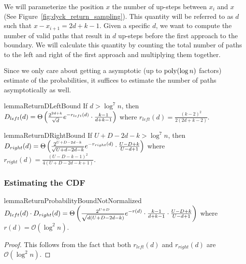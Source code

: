 We will parameterize the position $x$ the number of up-steps between $x_i$ and $x$
(See Figure~\ref{fig:dyck_return_sampling}).
This quantity will be referred to as $d$ such that $x - x_{i+1} = 2d + k-1$.
Given a specific $d$, we want to compute the number of valid paths that result in
$d$ up-steps before the first approach to the boundary.
We will calculate this quantity by counting the total number of paths to the left and right
of the first approach and multiplying them together.

Since we only care about getting a asymptotic (up to $\mathrm{poly}(\log n)$ factors) estimate of the probabilities,
it suffices to estimate the number of paths asymptotically as well.

\begin{restatable}{lemma}{ReturnDLeftBound}
\label{lem:ReturnDLeftBound}
If $d > \log^7 n$, then $D_{left}(d)
= \Theta\left( \frac{2^{2d+k}}{\sqrt{d}}\mathlarger e^{-r_{left}(d)}\cdot \frac{k-1}{d+k-1}\right)$
where $r_{left}(d) = \frac{(k-2)^2}{2(2d+k-2)}$.
\end{restatable}

\begin{restatable}{lemma}{ReturnDRightBound}
\label{lem:ReturnDRightBound}
If $U+D-2d-k > \log^7 n$, then $D_{right}(d)
= \Theta\left( \frac{2^{U+D-2d-k}}{\sqrt{U+d-2d-k}}\mathlarger e^{-r_{right}(d)}\cdot \frac{U-D+k}{U-d+1}\right)$
where $r_{right}(d) = \frac{(U-D-k-1)^2}{4(U+D-2d-k+1)}$.
\end{restatable}


\subsubsection{Estimating the CDF}%
\label{ssub:estimating_the_cdf}

\begin{restatable}{lemma}{ReturnProbabilityBoundNotNormalized}
\label{lem:ReturnProbabilityBoundNotNormalized}
$D_{left}(d)\cdot D_{right}(d)
= \Theta\left( \frac{2^{U+D}}{\sqrt{d(U+D-2d-k)}}\mathlarger e^{-r(d)}\cdot\frac{k-1}{d+k-1}\cdot\frac{U-D+k}{U-d+1}\right)$
where $r(d)=\mathcal O(\log^2 n)$.
\end{restatable}
\begin{proof}
This follows from the fact that both $r_{left}(d)$ and $r_{right}(d)$ are $\mathcal O(\log^2 n)$.
\end{proof}

